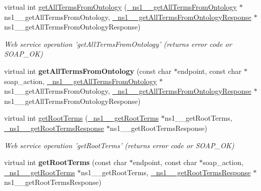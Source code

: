 \begin{DoxyCompactItemize}
\item 
\hypertarget{classOntologyQuerySoapBindingProxy_a95161fc8fe0fec86c4ef23439b06d8f3}{
virtual int \hyperlink{classOntologyQuerySoapBindingProxy_a95161fc8fe0fec86c4ef23439b06d8f3}{getAllTermsFromOntology} (\hyperlink{class__ns1____getAllTermsFromOntology}{\_\-ns1\_\-\_\-getAllTermsFromOntology} $\ast$ns1\_\-\_\-getAllTermsFromOntology, \hyperlink{class__ns1____getAllTermsFromOntologyResponse}{\_\-ns1\_\-\_\-getAllTermsFromOntologyResponse} $\ast$ns1\_\-\_\-getAllTermsFromOntologyResponse)}
\label{classOntologyQuerySoapBindingProxy_a95161fc8fe0fec86c4ef23439b06d8f3}

\begin{DoxyCompactList}\small\item\em Web service operation 'getAllTermsFromOntology' (returns error code or SOAP\_\-OK) \end{DoxyCompactList}\item 
\hypertarget{classOntologyQuerySoapBindingProxy_ad3566c8c68ace10aa0fa995cf2dbe28c}{
virtual int {\bfseries getAllTermsFromOntology} (const char $\ast$endpoint, const char $\ast$soap\_\-action, \hyperlink{class__ns1____getAllTermsFromOntology}{\_\-ns1\_\-\_\-getAllTermsFromOntology} $\ast$ns1\_\-\_\-getAllTermsFromOntology, \hyperlink{class__ns1____getAllTermsFromOntologyResponse}{\_\-ns1\_\-\_\-getAllTermsFromOntologyResponse} $\ast$ns1\_\-\_\-getAllTermsFromOntologyResponse)}
\label{classOntologyQuerySoapBindingProxy_ad3566c8c68ace10aa0fa995cf2dbe28c}

\item 
\hypertarget{classOntologyQuerySoapBindingProxy_adfecad69b884b9b8aaed839be3b2a7c7}{
virtual int \hyperlink{classOntologyQuerySoapBindingProxy_adfecad69b884b9b8aaed839be3b2a7c7}{getRootTerms} (\hyperlink{class__ns1____getRootTerms}{\_\-ns1\_\-\_\-getRootTerms} $\ast$ns1\_\-\_\-getRootTerms, \hyperlink{class__ns1____getRootTermsResponse}{\_\-ns1\_\-\_\-getRootTermsResponse} $\ast$ns1\_\-\_\-getRootTermsResponse)}
\label{classOntologyQuerySoapBindingProxy_adfecad69b884b9b8aaed839be3b2a7c7}

\begin{DoxyCompactList}\small\item\em Web service operation 'getRootTerms' (returns error code or SOAP\_\-OK) \end{DoxyCompactList}\item 
\hypertarget{classOntologyQuerySoapBindingProxy_a17f763cefe6c54545279cae1c77e03b9}{
virtual int {\bfseries getRootTerms} (const char $\ast$endpoint, const char $\ast$soap\_\-action, \hyperlink{class__ns1____getRootTerms}{\_\-ns1\_\-\_\-getRootTerms} $\ast$ns1\_\-\_\-getRootTerms, \hyperlink{class__ns1____getRootTermsResponse}{\_\-ns1\_\-\_\-getRootTermsResponse} $\ast$ns1\_\-\_\-getRootTermsResponse)}
\label{classOntologyQuerySoapBindingProxy_a17f763cefe6c54545279cae1c77e03b9}


\end{DoxyCompactItemize}
